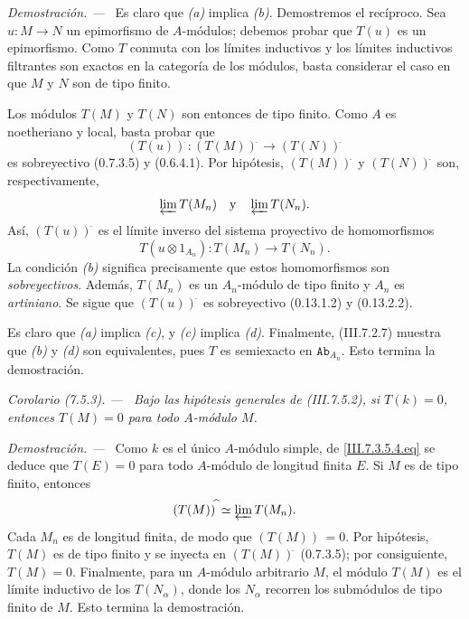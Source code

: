 \documentclass[10pt,oneside]{book}
\newcommand{\cat}[1]{\mathtt{#1}}
\newcommand{\sref}[2][]{\textup{(#2)}}
\newcommand{\oldpage}[2][]{\setcounter{footnote}{0}\marginpar{\scriptsize\textbf{#1}~|~#2}\ignorespaces}
\newenvironment{corollary}[1][]{\par\medskip\noindent\itshape Corolario (#1). ---\ }{\par}
\newenvironment{proof}{\par\medskip\noindent\textit{Demostración. ---\ }}{\par}
\begin{document}
\begin{proof}
Es claro que \emph{(a)} implica \emph{(b)}. Demostremos el recíproco. Sea
$u:M\to N$ un epimorfismo de $A$-módulos; debemos probar que $T(u)$
es un epimorfismo. Como $T$ conmuta con los límites inductivos y los
límites inductivos filtrantes son exactos en la categoría de los
módulos, basta considerar el caso en que $M$ y $N$ son de tipo
finito.

Los módulos $T(M)$ y $T(N)$ son entonces de tipo finito. Como $A$ es
noetheriano y local, basta probar que
\[
  (T(u))^{\widehat{\,}}:
  (T(M))^{\widehat{\,}}
  \longrightarrow
  (T(N))^{\widehat{\,}}
\]
es sobreyectivo \sref[0]{0.7.3.5} y \sref[0]{0.6.4.1}. Por hipótesis,
$(T(M))^{\widehat{\,}}$ y $(T(N))^{\widehat{\,}}$ son, respectivamente,
\[
  \varprojlim T(M_n)
  \quad\hbox{y}\quad
  \varprojlim T(N_n).
\]
Así, $(T(u))^{\widehat{\,}}$ es el límite inverso del sistema proyectivo de
homomorfismos
\[
  T(u\otimes 1_{A_n}):T(M_n)\longrightarrow T(N_n).
\]
La condición \emph{(b)} significa precisamente que estos homomorfismos son
\emph{sobreyectivos}. Además, $T(M_n)$ es un $A_n$-módulo de tipo finito y
$A_n$ es \emph{artiniano}. Se sigue que $(T(u))^{\widehat{\,}}$ es sobreyectivo
\sref[0]{0.13.1.2} y \sref[0]{0.13.2.2}.

Es claro que \emph{(a)} implica \emph{(c)}, y \emph{(c)} implica \emph{(d)}. Finalmente,
\sref{III.7.2.7} muestra que \emph{(b)} y \emph{(d)} son equivalentes, pues $T$ es
semiexacto en $\cat{Ab}_{A_n}$. Esto termina la demostración.
\end{proof}

\begin{corollary}[7.5.3]
\label{III.7.5.3}
Bajo las hipótesis generales de \sref{III.7.5.2}, si $T(k)=0$,
entonces $T(M)=0$ para todo $A$-módulo $M$.
\end{corollary}

\begin{proof}
\oldpage[III]{191}
Como $k$ es el único $A$-módulo simple, de
\eqref{III.7.3.5.4.eq} se deduce que $T(E)=0$ para todo $A$-módulo
de longitud finita $E$. Si $M$ es de tipo finito, entonces
\[
  (T(M))^{\widehat{\,}}
  \simeq
  \varprojlim T(M_n).
\]
Cada $M_n$ es de longitud finita, de modo que
$(T(M))^{\widehat{\,}}=0$. Por hipótesis, $T(M)$ es de tipo finito y se
inyecta en $(T(M))^{\widehat{\,}}$ \sref[0]{0.7.3.5}; por consiguiente,
$T(M)=0$. Finalmente, para un $A$-módulo arbitrario $M$, el módulo
$T(M)$ es el límite inductivo de los $T(N_\alpha)$, donde los
$N_\alpha$ recorren los submódulos de tipo finito de $M$. Esto
termina la demostración.
\end{proof}
\end{document}

